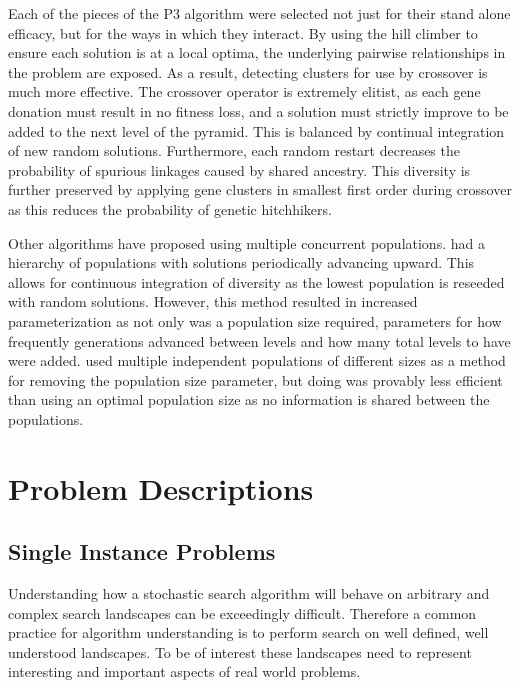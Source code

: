\documentclass[twoside]{article}
\begin{document}
Each of the pieces of the P3 algorithm were selected not just for their stand alone efficacy,
but for the ways in which they interact. By using the hill climber to ensure each solution
is at a local optima, the underlying pairwise relationships in the problem are exposed. As
a result, detecting clusters for use by crossover is much more effective. The crossover operator
is extremely elitist, as each gene donation must result in no fitness loss, and a solution must
strictly improve to be added to the next level of the pyramid. This is balanced by continual
integration of new random solutions. Furthermore, each random restart decreases the probability
of spurious linkages caused by shared ancestry. This diversity is further preserved by applying
gene clusters in smallest first order during crossover as this reduces the probability of genetic
hitchhikers.

Other algorithms have proposed using multiple concurrent populations.
\cite{hornby:2006:alps} had a hierarchy of populations with solutions periodically advancing
upward. This allows for continuous integration of diversity as the lowest population is reseeded
with random solutions. However, this method resulted in increased parameterization as not only was
a population size required, parameters for how frequently generations advanced between levels and
how many total levels to have were added. \cite{harik:1999:parameterlessga} used multiple independent
populations of different sizes as a method for removing the population size parameter, but
doing was provably less efficient than using an optimal population size as no information is shared
between the populations.

\section{Problem Descriptions}
\label{sec-problems}

\subsection{Single Instance Problems}
Understanding how a stochastic search algorithm will behave on arbitrary and complex
search landscapes can be exceedingly difficult. Therefore a common practice for
algorithm understanding is to perform search on well defined, well understood
landscapes. To be of interest these landscapes need to represent interesting
and important aspects of real world problems.
\end{document}
